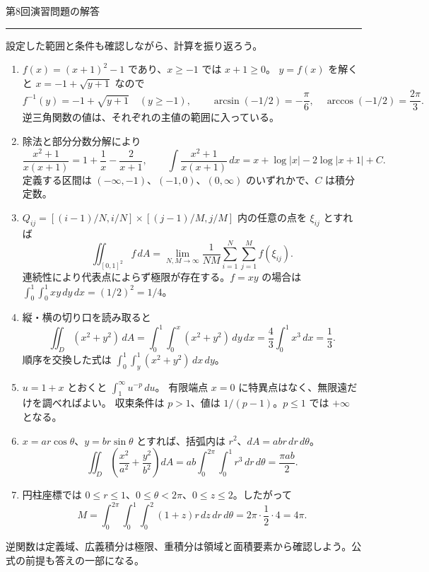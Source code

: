 \documentclass[a4paper,10pt,pdflatex,ja=standard,jafont=ipaex-type1,
  magstyle=real,scale=1]{bxjsarticle}
\newcommand{\handouttitle}[1]{%
  \begin{center}
    {\Large\color{ink}#1}\par\vspace{3mm}
    {\color{accent}\rule{0.88\linewidth}{0.7pt}}
  \end{center}\vspace{-2mm}}
\newcommand{\keybox}[1]{\par\vspace{3pt}\begingroup
  \setlength{\fboxsep}{4pt}%
  \colorbox{soft}{\parbox{\dimexpr\linewidth-2\fboxsep\relax}{\small #1}}%
  \endgroup\par\vspace{2pt}}
\newenvironment{problems}
  {\begin{enumerate}[leftmargin=2em,itemsep=3pt,topsep=3pt,parsep=0pt,
    font=\color{accent}]}
  {\end{enumerate}}
\begin{document}
\newpage
\handouttitle{第8回\quad 演習問題の解答}
{\small 設定した範囲と条件も確認しながら、計算を振り返ろう。}\par
\begin{problems}
\setlength{\itemsep}{7pt}
\item $f(x)=(x+1)^2-1$ であり、$x\ge-1$ では $x+1\ge0$。
$y=f(x)$ を解くと $x=-1+\sqrt{y+1}$ なので
$$
 f^{-1}(y)=-1+\sqrt{y+1}\quad(y\ge-1),\qquad
 \arcsin(-1/2)=-\frac\pi6,\quad \arccos(-1/2)=\frac{2\pi}3.
$$
逆三角関数の値は、それぞれの主値の範囲に入っている。

\item 除法と部分分数分解により
$$
 \frac{x^2+1}{x(x+1)}=1+\frac1x-\frac2{x+1},\qquad
 \int\frac{x^2+1}{x(x+1)}\,dx=x+\log|x|-2\log|x+1|+C.
$$
定義する区間は $(-\infty,-1)$、$(-1,0)$、$(0,\infty)$ のいずれかで、$C$ は積分定数。

\item $Q_{ij}=[(i-1)/N,i/N]\times[(j-1)/M,j/M]$ 内の任意の点を $\xi_{ij}$ とすれば
$$
 \iint_{[0,1]^2}f\,dA
 =\lim_{N,M\to\infty}\frac1{NM}\sum_{i=1}^N\sum_{j=1}^M f(\xi_{ij}).
$$
連続性により代表点によらず極限が存在する。$f=xy$ の場合は
$\int_0^1\int_0^1xy\,dy\,dx=(1/2)^2=1/4$。

\item 縦・横の切り口を読み取ると
$$
 \iint_D(x^2+y^2)\,dA
 =\int_0^1\int_0^x(x^2+y^2)\,dy\,dx
 =\frac43\int_0^1x^3\,dx=\frac13.
$$
順序を交換した式は $\displaystyle\int_0^1\int_y^1(x^2+y^2)\,dx\,dy$。

\item $u=1+x$ とおくと $\int_1^\infty u^{-p}\,du$。
有限端点 $x=0$ に特異点はなく、無限遠だけを調べればよい。
収束条件は $p>1$、値は $1/(p-1)$。$p\le1$ では $+\infty$ となる。

\item $x=ar\cos\theta$、$y=br\sin\theta$ とすれば、括弧内は $r^2$、$dA=ab r\,dr\,d\theta$。
$$
 \iint_D\left(\frac{x^2}{a^2}+\frac{y^2}{b^2}\right)dA
 =ab\int_0^{2\pi}\int_0^1r^3\,dr\,d\theta=\frac{\pi ab}{2}.
$$

\item 円柱座標では $0\le r\le1$、$0\le\theta<2\pi$、$0\le z\le2$。したがって
$$
 M=\int_0^{2\pi}\int_0^1\int_0^2(1+z)r\,dz\,dr\,d\theta
 =2\pi\cdot\frac12\cdot4=4\pi.
$$
\end{problems}
\keybox{逆関数は定義域、広義積分は極限、重積分は領域と面積要素から確認しよう。公式の前提も答えの一部になる。}
\end{document}
